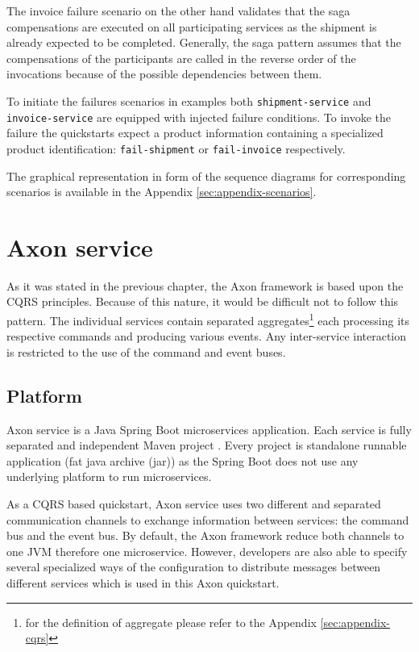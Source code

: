 \documentclass[oneside,
  digital, %
  table,   %
  nolof,     %
  nolot,     %
]{fithesis3}
\begin{document}
The invoice failure scenario on the other hand validates that the saga compensations are executed on all participating services as the shipment is already expected to be completed. Generally, the saga pattern assumes that the compensations of the participants are called in the reverse order of the invocations because of the possible dependencies between them.

To initiate the failures scenarios in examples both \texttt{shipment-service} and \texttt{invoice-service} are equipped with injected failure conditions. To invoke the failure the quickstarts expect a product information containing a specialized product identification: \texttt{fail-shipment} or \texttt{fail-invoice} respectively. 

The graphical representation in form of the sequence diagrams for corresponding scenarios is available in the Appendix \ref{sec:appendix-scenarios}.

\section{Axon service}

As it was stated in the previous chapter, the Axon framework is based upon the CQRS principles. Because of this nature, it would be difficult not to follow this pattern. The individual services contain separated aggregates\footnote{for the definition of aggregate please refer to the Appendix \ref{sec:appendix-cqrs}} each processing its respective commands and producing various events. Any inter-service interaction is restricted to the use of the command and event buses.

\subsection{Platform}

Axon service is a Java Spring Boot \cite{spring_boot} microservices application. Each service is fully separated and independent Maven  project \cite{maven}. Every project is standalone runnable application (fat java archive (jar)) as the Spring Boot does not use any underlying platform to run microservices.

As a CQRS based quickstart, Axon service uses two different and separated communication channels to exchange information between services: the command bus and the event bus. By default, the Axon framework reduce both channels to one JVM therefore one microservice. However, developers are also able to specify several specialized ways of the configuration to distribute messages between different services which is used in this Axon quickstart.
\end{document}
